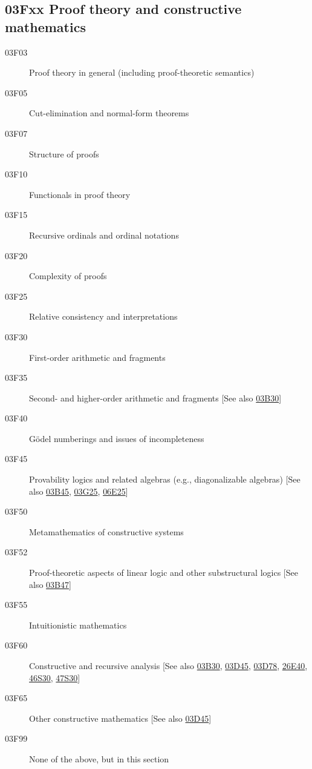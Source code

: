 \subsection*{03Fxx  Proof theory and constructive mathematics }\label{03Fxx}
\begin{description}
\item [03F03]\label{03F03} Proof theory in general (including proof-theoretic semantics)
\item [03F05]\label{03F05} Cut-elimination and normal-form theorems
\item [03F07]\label{03F07} Structure of proofs
\item [03F10]\label{03F10} Functionals in proof theory
\item [03F15]\label{03F15} Recursive ordinals and ordinal notations
\item [03F20]\label{03F20} Complexity of proofs
\item [03F25]\label{03F25} Relative consistency and interpretations
\item [03F30]\label{03F30} First-order arithmetic and fragments
\item [03F35]\label{03F35} Second- and higher-order arithmetic and fragments [See also \hyperref[03B30]{03B30}]
\item [03F40]\label{03F40} G\"{o}del numberings and issues of incompleteness
\item [03F45]\label{03F45} Provability logics and related algebras (e.g., diagonalizable algebras) [See also \hyperref[03B45]{03B45}, \hyperref[03G25]{03G25}, \hyperref[06E25]{06E25}]
\item [03F50]\label{03F50} Metamathematics of constructive systems
\item [03F52]\label{03F52} Proof-theoretic aspects of linear logic and other substructural logics [See also \hyperref[03B47]{03B47}]
\item [03F55]\label{03F55} Intuitionistic mathematics
\item [03F60]\label{03F60} Constructive and recursive analysis [See also \hyperref[03B30]{03B30}, \hyperref[03D45]{03D45}, \hyperref[03D78]{03D78}, \hyperref[26E40]{26E40}, \hyperref[46S30]{46S30}, \hyperref[47S30]{47S30}]
\item [03F65]\label{03F65} Other constructive mathematics [See also \hyperref[03D45]{03D45}]
\item [03F99]\label{03F99} None of the above, but in this section
\end{description}
